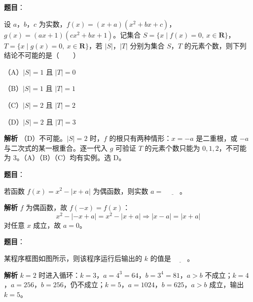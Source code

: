 \begin{answer}

\textbf{题目}：

设 $a$，$b$，$c$ 为实数，$f(x)=(x+a)(x^2+bx+c)$，$g(x)=(ax+1)(cx^2+bx+1)$。记集合 $S=\{x\mid f(x)=0,\ x\in\mathbf R\}$，$T=\{x\mid g(x)=0,\ x\in\mathbf R\}$，若 $|S|$，$|T|$ 分别为集合 $S$，$T$ 的元素个数，则下列结论不可能的是\mbox{（　　）}

（A）$|S|=1$ 且 $|T|=0$

（B）$|S|=1$ 且 $|T|=1$

（C）$|S|=2$ 且 $|T|=2$

（D）$|S|=2$ 且 $|T|=3$

\textbf{解析}
（D）不可能。$|S|=2$ 时，$f$ 的根只有两种情形：$x=-a$ 是二重根，或 $-a$ 与二次式的某一根重合。逐一代入 $g$ 可验证 $T$ 的元素个数只能为 $0,1,2$，不可能为 $3$。（A）（B）（C）均有实例。选 D。


\end{answer}
\begin{answer}

\textbf{题目}：

若函数 $f(x)=x^2-|x+a|$ 为偶函数，则实数 $a=$ $\underline{\qquad}$。

\textbf{解析}
$f$ 为偶函数，故 $f(-x)=f(x)$：
\nopagebreak[4]
\[x^2-|{-x+a}|=x^2-|x+a|\Longrightarrow|{x-a}|=|{x+a}|\]
对任意 $x$ 成立，故 $a=0$。


\end{answer}
\begin{answer}

\textbf{题目}：

某程序框图如图所示，则该程序运行后输出的 $k$ 的值是 $\underline{\qquad}$。
\nopagebreak[4]
\begin{center}\end{center}
\nopagebreak[4]
\textbf{解析}
$k=2$ 时进入循环：$k=3$，$a=4^3=64$，$b=3^4=81$，$a>b$ 不成立；$k=4$，$a=256$，$b=256$，仍不成立；$k=5$，$a=1024$，$b=625$，$a>b$ 成立，输出 $k=5$。


\end{answer}
